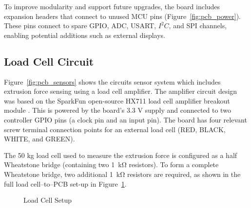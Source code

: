 To improve modularity and support future upgrades, the board includes expansion headers that connect to unused MCU pins (Figure~\ref{fig:pcb_power}). These pins connect to spare GPIO, ADC, USART, \(I^2C\), and SPI channels, enabling potential additions such as external displays.

\subsection{Load Cell Circuit}
Figure~\ref{fig:pcb_sensors} shows the circuits sensor system which includes extrusion force sensing using a load cell amplifier. The amplifier circuit design was based on the SparkFun open-source HX711 load cell amplifier breakout module \citep{SparkFunHX711}. This is powered by the board's 3.3 V supply and connected to two controller GPIO pins (a clock pin and an input pin). The board has four relevant screw terminal connection points for an external load cell (RED, BLACK, WHITE, and GREEN).

The 50 kg load cell used to measure the extrusion force is configured as a half Wheatstone bridge (containing two \SI{1}{\kilo\ohm} resistors). To form a complete Wheatstone bridge, two additional \SI{1}{\kilo\ohm} resistors are required, as shown in the full load cell–to–PCB set-up in Figure~\ref{fig:loadcell}.
\begin{figure}[H]
\centering
{}
\caption{Load Cell Setup}
\label{fig:loadcell}
\end{figure}

